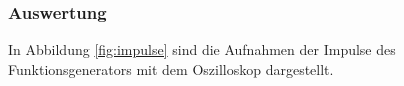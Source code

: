 \documentclass[12pt,a4paper]{article}
\begin{document}
\subsubsection*{Auswertung}
In Abbildung \ref{fig:impulse} sind die Aufnahmen der Impulse des Funktionsgenerators mit dem Oszilloskop dargestellt.
\end{document}
